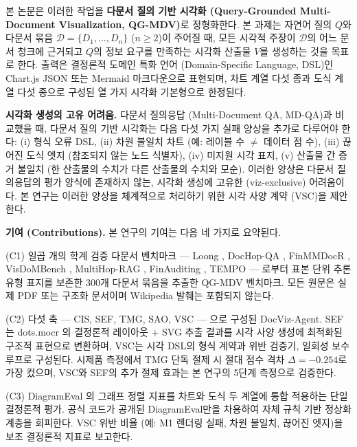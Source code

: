 \documentclass[11pt]{article}
\begin{document}
본 논문은 이러한 작업을 \textbf{다문서 질의 기반 시각화 (Query-Grounded Multi-Document Visualization, QG-MDV)}로 정형화한다. 본 과제는 자연어 질의 $Q$와 다문서 묶음 $\mathcal{D} = \{D_1, \dots, D_n\}$ ($n \geq 2$)이 주어질 때, 모든 시각적 주장이 $\mathcal{D}$의 어느 문서 청크에 근거되고 $Q$의 정보 요구를 만족하는 시각화 산출물 $V$를 생성하는 것을 목표로 한다. 출력은 결정론적 도메인 특화 언어 (Domain-Specific Language, DSL)인 Chart.js JSON 또는 Mermaid 마크다운으로 표현되며, 차트 계열 다섯 종과 도식 계열 다섯 종으로 구성된 열 가지 시각화 기본형으로 한정된다.

\textbf{시각화 생성의 고유 어려움.} 다문서 질의응답 (Multi-Document QA, MD-QA)과 비교했을 때, 다문서 질의 기반 시각화는 다음 다섯 가지 실패 양상을 추가로 다루어야 한다: (i) 형식 오류 DSL, (ii) 차원 불일치 차트 (예: 레이블 수 $\neq$ 데이터 점 수), (iii) 끊어진 도식 엣지 (참조되지 않는 노드 식별자), (iv) 미지원 시각 표지, (v) 산출물 간 증거 불일치 (한 산출물의 수치가 다른 산출물의 수치와 모순). 이러한 양상은 다문서 질의응답의 평가 양식에 존재하지 않는, 시각화 생성에 고유한 (viz-exclusive) 어려움이다. 본 연구는 이러한 양상을 체계적으로 처리하기 위한 시각 사양 계약 (VSC)을 제안한다.

\textbf{기여 (Contributions).} 본 연구의 기여는 다음 네 가지로 요약된다.

(C1) 일곱 개의 학계 검증 다문서 벤치마크 — Loong \cite{wang2024loong}, DocHop-QA \cite{xiaoaug2025dochop}, FinMMDocR \cite{2026finmmdocr}, VisDoMBench \cite{suri2025visdom}, MultiHop-RAG \cite{tang2024multihoprag}, FinAuditing \cite{wang2025finauditing}, TEMPO \cite{2026tempo} — 로부터 표본 단위 추론 유형 표지를 보존한 300개 다문서 묶음을 추출한 QG-MDV 벤치마크. 모든 원문은 실제 PDF 또는 구조화 문서이며 Wikipedia 발췌는 포함되지 않는다.

(C2) 다섯 축 — CIS, SEF, TMG, SAO, VSC — 으로 구성된 DocViz-Agent. SEF는 dots.mocr \cite{zheng2026dotsmocr}의 결정론적 레이아웃 + SVG 추출 결과를 시각 사양 생성에 최적화된 구조적 표현으로 변환하며, VSC는 시각 DSL의 형식 계약과 위반 검증기, 일회성 보수 루프로 구성된다. 시제품 측정에서 TMG 단독 절제 시 절대 점수 격차 $\Delta=-0.254$로 가장 컸으며, VSC와 SEF의 추가 절제 효과는 본 연구의 5단계 측정으로 검증한다.

(C3) DiagramEval \cite{liang2025diagrameval}의 그래프 정렬 지표를 차트와 도식 두 계열에 통합 적용하는 단일 결정론적 평가. 공식 코드가 공개된 DiagramEval만을 차용하여 자체 규칙 기반 정상화 계층을 회피한다. VSC 위반 비율 (예: M1 렌더링 실패, 차원 불일치, 끊어진 엣지)을 보조 결정론적 지표로 보고한다.
\end{document}
